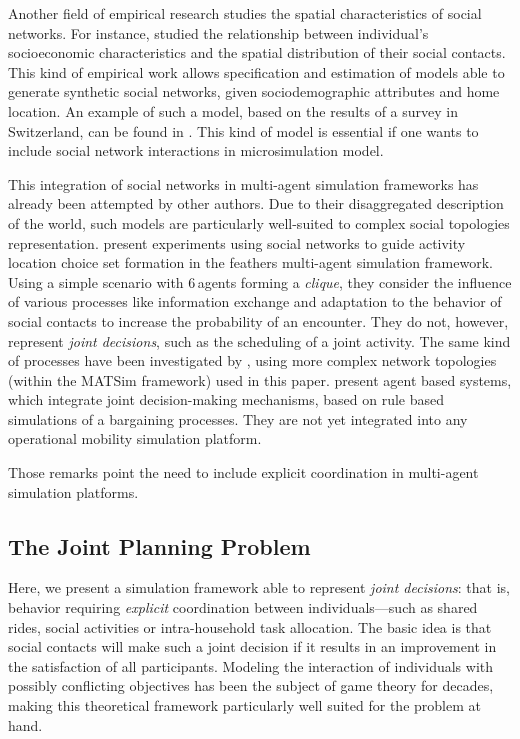 {Another field of empirical research studies the spatial characteristics of social networks. For instance, \citet{CarrascoJAEtAl_TRR_2008} studied the relationship between individual's socioeconomic
characteristics and the spatial distribution of their social contacts. This kind of empirical work allows specification and estimation of models able to generate synthetic social networks, given sociodemographic attributes and home location. An example of such a model, based on the results of a survey in Switzerland, can be found in \citet{ArentzeEtAl_TRB_2012}. This kind of model is essential if one wants to include social network interactions in \gls{microsimulation} model.

This integration of social networks in multi-agent simulation frameworks has already been attempted by other authors. Due to their disaggregated description of the world, such models are particularly well-suited to complex social topologies representation. \citet{HanQEtAl_TransResPartA_2011} present experiments using social networks to guide activity location choice set formation in the \gls{feathers} multi-agent simulation framework. Using a simple scenario with 6\,agents forming a \emph{clique}, %
they consider the influence of various processes like information exchange and adaptation to the behavior of social contacts to increase the probability of an encounter. They do not, however, represent \emph{joint decisions}, such as the scheduling of a joint activity. The same kind of processes have been investigated by \citet{Hackney_PhDThesis_2009}, using more complex network topologies (within the MATSim framework) used in this paper. \citet{RonaldEtAl_TransResB_2012, MaEtAl_TRR_2011, MaEtAl_IATBR_2012} present agent based systems, which integrate joint decision-making mechanisms, based on rule based simulations of a bargaining processes. They are not yet integrated into any operational mobility simulation platform.

Those remarks point the need to include explicit coordination in multi-agent simulation platforms.

\subsection{The Joint Planning Problem}
Here, we present a simulation framework able to represent \emph{joint decisions}: that is, behavior requiring \emph{explicit} coordination between individuals---such as shared rides, social activities or intra-household task allocation. The basic idea is that social contacts will make such a joint decision if it results in an improvement in the satisfaction of all participants. Modeling the interaction of individuals with possibly conflicting objectives has been the subject of game theory for decades, making this theoretical framework particularly well suited for the problem at hand.

}
